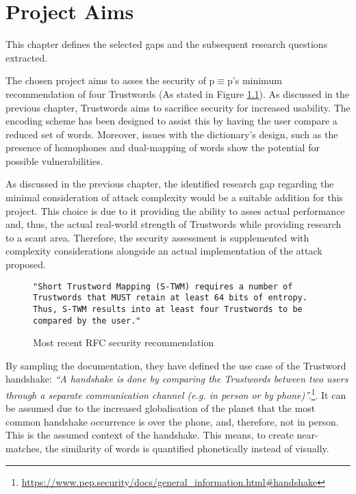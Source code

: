 \chapter{Project Aims}

This chapter defines the selected gaps and the subsequent research questions extracted.

The chosen project aims to asses the security of p$\equiv$p's minimum recommendation of four Trustwords (As stated in Figure \ref{fig:trustwordsNum}). As discussed in the previous chapter, Trustwords aims to sacrifice security for increased usability. The encoding scheme has been designed to assist this by having  the user compare a reduced set of words. Moreover, issues with the dictionary's design, such as the presence of homophones and dual-mapping of words show the potential for possible vulnerabilities. 

As discussed in the previous chapter, the identified research gap regarding the minimal consideration of attack complexity would be a suitable addition for this project. This choice is due to it providing the ability to asses actual performance and, thus, the actual real-world strength of Trustwords while providing research to a scant area. Therefore, the security assessment is supplemented with complexity considerations alongside an actual implementation of the attack proposed.

\begin{center}
\begin{figure}[h!]
    \centering
        
    \begin{lstlisting}[frame=single, numbers=none]
"Short Trustword Mapping (S-TWM) requires a number of 
Trustwords that MUST retain at least 64 bits of entropy. 
Thus, S-TWM results into at least four Trustwords to be 
compared by the user."
    \end{lstlisting}

    \caption{Most recent RFC security recommendation}
    \label{fig:trustwordsNum}
\end{figure}
\end{center}
By sampling the \pep documentation, they have defined the use case of the Trustword handshake: \textit{``A handshake is done by comparing the Trustwords between two users through a separate communication channel (e.g. in person or by phone)''.}\footnote{\url{https://www.pep.security/docs/general\_information.html\#handshake}}. It can be assumed due to the increased globalisation of the planet that the most common handshake occurrence is over the phone, and, therefore, not in person. This is the assumed context of the handshake. This means, to create near-matches, the similarity of words is quantified phonetically instead of visually.

